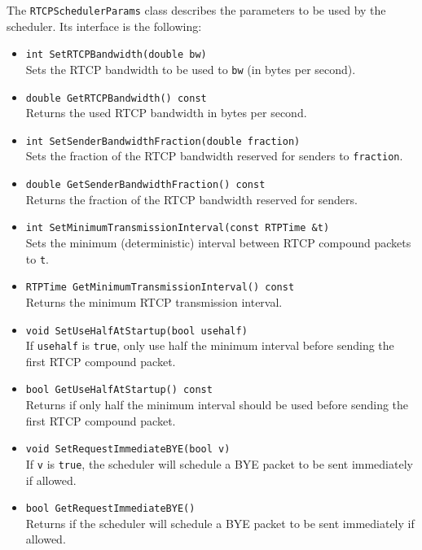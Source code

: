 \documentclass[12pt,a4paper]{article}
\begin{document}
					The {\tt RTCPSchedulerParams} class describes the parameters to be used by the
					scheduler. Its interface is the following:
					\begin{itemize}
						\item {\tt int SetRTCPBandwidth(double bw)}\\
							Sets the RTCP bandwidth to be used to {\tt bw} (in bytes per second).
						\item {\tt double GetRTCPBandwidth() const}\\
							Returns the used RTCP bandwidth in bytes per second.
						\item {\tt int SetSenderBandwidthFraction(double fraction)}\\
							Sets the fraction of the RTCP bandwidth reserved for senders
							to {\tt fraction}.
						\item {\tt double GetSenderBandwidthFraction() const}\\
							Returns the fraction of the RTCP bandwidth reserved for senders.
						\item {\tt int SetMinimumTransmissionInterval(const RTPTime \&t)}\\
							Sets the minimum (deterministic) interval between RTCP compound packets
							to {\tt t}.
						\item {\tt RTPTime GetMinimumTransmissionInterval() const}\\
							Returns the minimum RTCP transmission interval.
						\item {\tt void SetUseHalfAtStartup(bool usehalf)}\\
							If {\tt usehalf} is {\tt true}, only use half the minimum interval
							before sending the first RTCP compound packet.
						\item {\tt bool GetUseHalfAtStartup() const}\\
							Returns if only half the minimum interval should be used before sending
							the first RTCP compound packet.
						\item {\tt void SetRequestImmediateBYE(bool v)}\\
							If {\tt v} is {\tt true}, the scheduler will schedule a BYE packet
							to be sent immediately if allowed.
						\item {\tt bool GetRequestImmediateBYE()}\\
							Returns if the scheduler will schedule a BYE packet to be sent immediately
							if allowed.
					\end{itemize}
\end{document}
